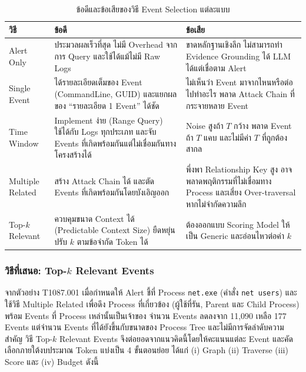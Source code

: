 \begin{table}[htbp]
  \centering
  \caption{ข้อดีและข้อเสียของวิธี Event Selection แต่ละแบบ}
  \label{tab:es-methods}
  \begin{tabular}{|L{0.16\textwidth}|L{0.36\textwidth}|L{0.36\textwidth}|}
    \hline
    \textbf{วิธี} & \textbf{ข้อดี} & \textbf{ข้อเสีย} \\ \hline
    Alert Only &
      ประมวลผลเร็วที่สุด ไม่มี Overhead จากการ Query และใช้ได้แม้ไม่มี Raw Logs &
      ขาดหลักฐานเชิงลึก ไม่สามารถทำ Evidence Grounding ได้ LLM ได้แต่เชื่อตาม Alert \\ \hline
    Single Event &
      ได้รายละเอียดเต็มของ Event (CommandLine, GUID) และแยกผลของ ``รายละเอียด 1 Event'' ได้ชัด &
      ไม่เห็นว่า Event มาจากไหนหรือต่อไปทำอะไร พลาด Attack Chain ที่กระจายหลาย Event \\ \hline
    Time Window &
      Implement ง่าย (Range Query) ใช้ได้กับ Logs ทุกประเภท และจับ Events ที่เกิดพร้อมกันแต่ไม่เชื่อมกันทางโครงสร้างได้ &
      Noise สูงถ้า $T$ กว้าง พลาด Event ถ้า $T$ แคบ และไม่มีค่า $T$ ที่ถูกต้องสากล \\ \hline
    Multiple Related &
      สร้าง Attack Chain ได้ และตัด Events ที่เกิดพร้อมกันโดยบังเอิญออก &
      พึ่งพา Relationship Key สูง อาจพลาดพฤติกรรมที่ไม่เชื่อมทาง Process และเสี่ยง Over-traversal หากไม่จำกัดความลึก \\ \hline
    Top-$k$ Relevant &
      ควบคุมขนาด Context ได้ (Predictable Context Size) ยืดหยุ่น ปรับ $k$ ตามข้อจำกัด Token ได้ &
      ต้องออกแบบ Scoring Model ให้เป็น Generic และอ่อนไหวต่อค่า $k$ \\ \hline
  \end{tabular}
\end{table}

\FloatBarrier

\subsubsection{วิธีที่เสนอ: Top-$k$ Relevant Events}
\label{sec:topk}
จากตัวอย่าง T1087.001 เมื่อกำหนดให้ Alert ชี้ที่ Process \texttt{net.exe} (คำสั่ง \texttt{net users})
และใช้วิธี Multiple Related เพื่อดึง Process ที่เกี่ยวข้อง (ผู้ใช้ที่รัน, Parent และ Child Process)
พร้อม Events ที่ Process เหล่านั้นเป็นเจ้าของ จำนวน Events ลดลงจาก 11,090 เหลือ 177 Events
แต่จำนวน Events ที่ได้ยังขึ้นกับขนาดของ Process Tree และไม่มีการจัดลำดับความสำคัญ
วิธี Top-$k$ Relevant Events จึงต่อยอดจากแนวคิดนี้โดยให้คะแนนแต่ละ Event และคัดเลือกภายใต้งบประมาณ Token
แบ่งเป็น 4 ขั้นตอนย่อย ได้แก่ (i) Graph (ii) Traverse (iii) Score และ (iv) Budget ดังนี้

